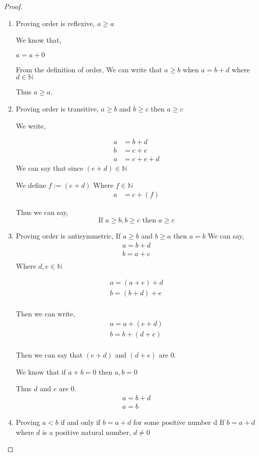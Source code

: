 \documentclass[11pt]{report}
\begin{document}
\begin{proof}
\begin{enumerate}
\item Proving order is reflexive, $a \geq a$

We know that,

$a = a + 0$

From the definition of order,
We can write that $a \geq b$ when $a = b + d$ where $d \in \mathbb{N}$

Thus $a \geq a$.

\item Proving order is transitive, $a \geq b$ and $b \geq c$ then $a \geq c$

We write,

\begin{align*}
a &= b + d \\
b &= c + e \\
a &= c + e + d
\end{align*}
We can say that since $(e+d) \in \mathbb{N}$

We define $f := (e+d)$
Where $f \in \mathbb{N}$
\begin{align*}
a &= c + (f)
\end{align*}

Thus we can say,
$$\text{If } a \geq b, b \geq c \text{ then } a \geq c$$

\item Proving order is antisymmetric, If $a \geq b$ and $b \geq a$ then $a=b$
We can say,
\begin{align*}
a = b + d \\
b = a + e \\
\end{align*}
Where $d,e \in \mathbb{N}$

\begin{align*}
a = (a + e) + d\\
b = (b + d) + e \\
\end{align*}

Then we can write,
\begin{align*}
a = a + (e + d)\\
b = b + (d + e) \\
\end{align*}

Then we can say that $(e+d)$ and $(d+e)$ are 0.

We know that if $a + b = 0$ then $a,b = 0$

Thus $d$ and $e$ are 0.
\begin{align*}
a = b + d \\
a = b
\end{align*}
\item Proving $a < b$ if and only if $b =a+d$ for some positive number d
If $b = a+d$ where $d$ is a positive natural number, $d \neq 0$


\end{enumerate}
\end{proof}
\end{document}
